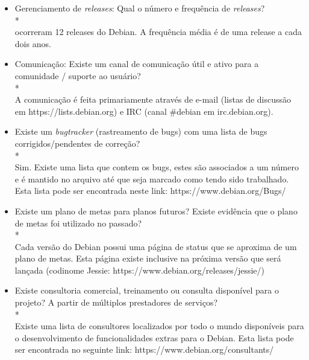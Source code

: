 \documentclass[12pt,a4paper]{article} %
\begin{document}
\begin{itemize}
\item Gerenciamento de \textit{releases}: Qual o número e frequência de \textit{releases}?
\\*
\\ocorreram 12 releases do Debian. A frequência média é de uma release a cada dois anos.
\linebreak
\item Comunicação: Existe um canal de comunicação útil e ativo para a comunidade / suporte ao usuário?
\\*
\\A comunicação é feita primariamente através de e-mail (listas de discussão em https://lists.debian.org) e IRC (canal #debian em irc.debian.org).
\linebreak
\item Existe um \textit{bugtracker} (rastreamento de bugs) com uma lista de bugs corrigidos/pendentes de correção?
\\*
\\Sim. Existe uma lista que contem os bugs, estes são associados a um número e é mantido no arquivo até que seja marcado como tendo sido trabalhado. Esta lista pode ser encontrada neste link: https://www.debian.org/Bugs/
\linebreak
\item Existe um plano de metas para planos futuros? Existe evidência que o plano de metas foi utilizado no passado?
\\*
\\Cada versão do Debian possui uma página de status que se aproxima de um plano de metas. Esta página existe inclusive na próxima versão que será lançada (codinome Jessie: https://www.debian.org/releases/jessie/)
\linebreak

\item Existe consultoria comercial, treinamento ou consulta disponível para o projeto? A partir de múltiplos prestadores de serviços?         
\\*
\\Existe uma lista de consultores localizados por todo o mundo disponíveis para o desenvolvimento de funcionalidades extras para o Debian. Esta lista pode ser encontrada no seguinte link: https://www.debian.org/consultants/
\linebreak

\end{itemize}
        

\par\vspace{\baselineskip}

\end{document}
